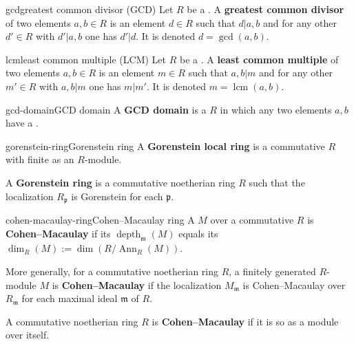 \begin{topic}{gcd}{greatest common divisor (GCD)}
    Let $R$ be a . A \textbf{greatest common divisor} of two elements $a, b \in R$ is an element $d \in R$ such that $d | a, b$ and for any other $d' \in R$ with $d' | a, b$ one has $d' | d$. It is denoted $d = \operatorname{gcd}(a, b)$.
\end{topic}

\begin{topic}{lcm}{least common multiple (LCM)}
    Let $R$ be a . A \textbf{least common multiple} of two elements $a, b \in R$ is an element $m \in R$ such that $a, b | m$ and for any other $m' \in R$ with $a, b | m$ one has $m | m'$. It is denoted $m = \operatorname{lcm}(a, b)$.
\end{topic}

\begin{topic}{gcd-domain}{GCD domain}
    A \textbf{GCD domain} is a  $R$ in which any two elements $a, b$ have a .
\end{topic}

\begin{topic}{gorenstein-ring}{Gorenstein ring}
    A \textbf{Gorenstein local ring} is a commutative    $R$ with finite  as an $R$-module.
    
    A \textbf{Gorenstein ring} is a commutative noetherian ring $R$ such that the localization $R_\mathfrak{p}$ is Gorenstein for each  $\mathfrak{p}$.
\end{topic}

\begin{topic}{cohen-macaulay-ring}{Cohen--Macaulay ring}
    A   $M$ over a commutative    $R$ is \textbf{Cohen--Macaulay} if its  $\operatorname{depth}_{\mathfrak{m}}(M)$ equals its  $\dim_R(M) := \dim(R/\operatorname{Ann}_R(M))$.
    
    More generally, for a commutative noetherian ring $R$, a finitely generated $R$-module $M$ is \textbf{Cohen--Macaulay} if the localization $M_\mathfrak{m}$ is Cohen--Macaulay over $R_\mathfrak{m}$ for each maximal ideal $\mathfrak{m}$ of $R$.
    
    A commutative noetherian ring $R$ is \textbf{Cohen--Macaulay} if it is so as a module over itself.
\end{topic}

